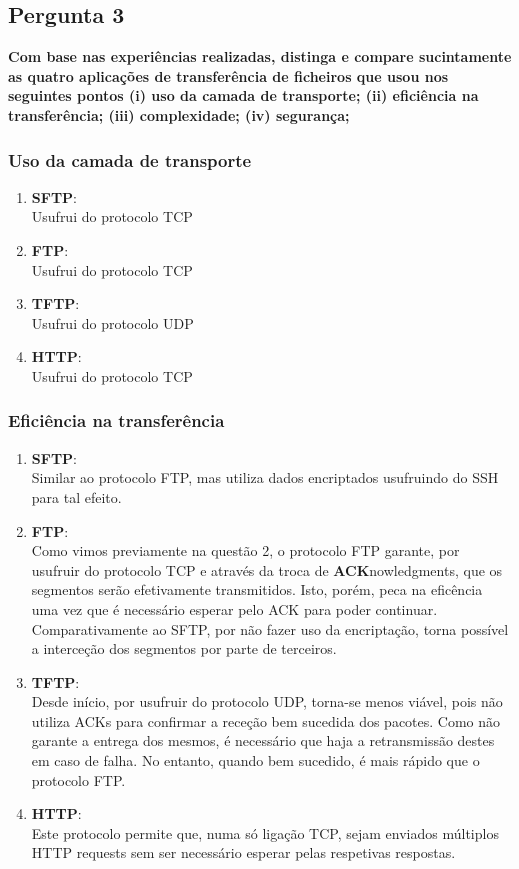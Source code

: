 \documentclass[11pt]{article}
\begin{document}
\subsection{Pergunta 3}

\textbf{Com base nas experiências realizadas, distinga e compare sucintamente as quatro aplicações de transferência de ficheiros que usou nos seguintes pontos (i) uso da camada de transporte; (ii) eficiência na transferência; (iii) complexidade; (iv) segurança;}

\subsubsection{Uso da camada de transporte}
\begin{enumerate}
  \item \textbf{SFTP}:\\
  Usufrui do protocolo TCP
  \item \textbf{FTP}:\\
  Usufrui do protocolo TCP
  \item \textbf{TFTP}:\\
  Usufrui do protocolo UDP
  \item \textbf{HTTP}:\\
  Usufrui do protocolo TCP
\end{enumerate}

\subsubsection{Eficiência na transferência}
\begin{enumerate}
  \item \textbf{SFTP}:\\
  Similar ao protocolo FTP, mas utiliza dados encriptados usufruindo do SSH para tal efeito.
  \item \textbf{FTP}:\\
  Como vimos previamente na questão 2, o protocolo FTP garante, por usufruir do protocolo TCP e através da troca de \textbf{ACK}nowledgments, que os segmentos serão efetivamente transmitidos. Isto, porém, peca na eficência uma vez que é necessário esperar pelo ACK para poder continuar. Comparativamente ao SFTP, por não fazer uso da encriptação, torna possível a interceção dos segmentos por parte de terceiros.
  \item \textbf{TFTP}:\\
  Desde início, por usufruir do protocolo UDP, torna-se menos viável, pois não utiliza ACKs para confirmar a receção bem sucedida dos pacotes. Como não garante a entrega dos mesmos, é necessário que haja a retransmissão destes em caso de falha. No entanto, quando bem sucedido, é mais rápido que o protocolo FTP.
  \item \textbf{HTTP}:\\
  Este protocolo permite que, numa só ligação TCP, sejam enviados múltiplos HTTP requests
  sem ser necessário esperar pelas respetivas respostas.
\end{enumerate}
\end{document}
